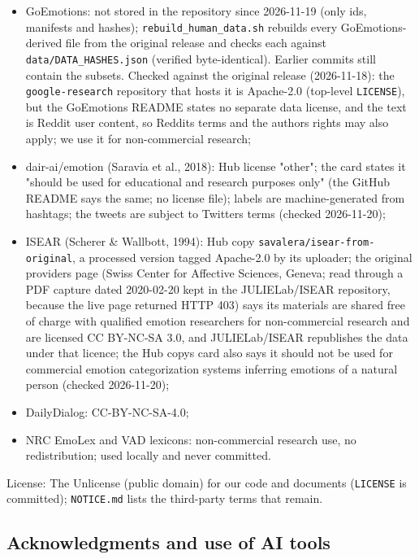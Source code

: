 \documentclass[
  10pt,
]{article}
\providecommand{\tightlist}{%
  \setlength{\itemsep}{0pt}\setlength{\parskip}{0pt}}
\begin{document}
\begin{itemize}
\tightlist
\item
  GoEmotions: not stored in the repository since 2026-11-19 (only ids,
  manifests and hashes); \texttt{rebuild\_human\_data.sh} rebuilds every
  GoEmotions-derived file from the original release and checks each
  against \texttt{data/DATA\_HASHES.json} (verified byte-identical).
  Earlier commits still contain the subsets. Checked against the
  original release (2026-11-18): the \texttt{google-research} repository
  that hosts it is Apache-2.0 (top-level \texttt{LICENSE}), but the
  GoEmotions README states no separate data license, and the text is
  Reddit user content, so Reddit\textquotesingle s terms and the
  authors\textquotesingle{} rights may also apply; we use it for
  non-commercial research;
\item
  dair-ai/emotion (Saravia et al., 2018): Hub license "other"; the card
  states it "should be used for educational and research purposes only"
  (the GitHub README says the same; no license file); labels are
  machine-generated from hashtags; the tweets are subject to
  Twitter\textquotesingle s terms (checked 2026-11-20);
\item
  ISEAR (Scherer \& Wallbott, 1994): Hub copy
  \texttt{savalera/isear-from-original}, a processed version tagged
  Apache-2.0 by its uploader; the original provider\textquotesingle s
  page (Swiss Center for Affective Sciences, Geneva; read through a PDF
  capture dated 2020-02-20 kept in the JULIELab/ISEAR repository,
  because the live page returned HTTP 403) says its materials are shared
  free of charge with qualified emotion researchers for non-commercial
  research and are licensed CC BY-NC-SA 3.0, and JULIELab/ISEAR
  republishes the data under that licence; the Hub
  copy\textquotesingle s card also says it should not be used for
  commercial emotion categorization systems inferring emotions of a
  natural person (checked 2026-11-20);
\item
  DailyDialog: CC-BY-NC-SA-4.0;
\item
  NRC EmoLex and VAD lexicons: non-commercial research use, no
  redistribution; used locally and never committed.
\end{itemize}

License: The Unlicense (public domain) for our code and documents
(\texttt{LICENSE} is committed); \texttt{NOTICE.md} lists the
third-party terms that remain.

\subsection{Acknowledgments and use of AI
tools}\label{acknowledgments-and-use-of-ai-tools}
\end{document}
